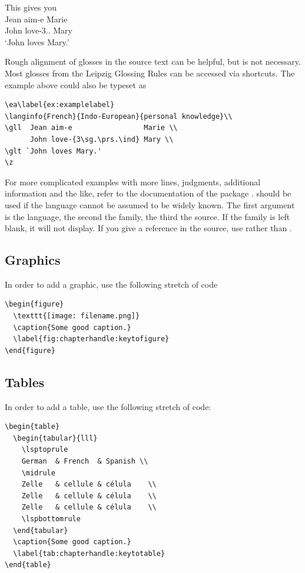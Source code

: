 This gives you
\ea\label{ex:examplelabel}
\\
\gll  Jean aim-e Marie \\
      John love-{3\sg.\prs.\ind} Mary \\
\glt `John loves Mary.'    
\z

Rough alignment of glosses in the source text can be helpful, but is not necessary.
Most glosses from the Leipzig Glossing Rules can be accessed via shortcuts. The example above could also be typeset as

\begin{verbatim}
\ea\label{ex:examplelabel}
\langinfo{French}{Indo-European}{personal knowledge}\\
\gll  Jean aim-e                 Marie \\
      John love-{3\sg.\prs.\ind} Mary \\
\glt `John loves Mary.'    
\z
\end{verbatim}

For more complicated examples with more lines, judgments, additional information and the like, refer to the documentation of the package .
 should be used if the language cannot be assumed to be widely known. The first argument is the language, the second the family, the third the source. If the family is left blank, it will not display. If you give a reference in the source, use  rather than .

\subsection{Graphics}
In order to add a graphic, use the following stretch of code

\begin{verbatim}
\begin{figure}
  \texttt{[image: filename.png]}
  \caption{Some good caption.}
  \label{fig:chapterhandle:keytofigure}
\end{figure}
\end{verbatim}

\subsection{Tables}
In order to add a table, use the following stretch of code:

\begin{verbatim}
\begin{table} 
  \begin{tabular}{lll}
    \lsptoprule
    German  & French  & Spanish \\
    \midrule
    Zelle   & cellule & célula    \\
    Zelle   & cellule & célula    \\
    Zelle   & cellule & célula    \\
    \lspbottomrule
  \end{tabular}
  \caption{Some good caption.}
  \label{tab:chapterhandle:keytotable}
\end{table}
\end{verbatim}

